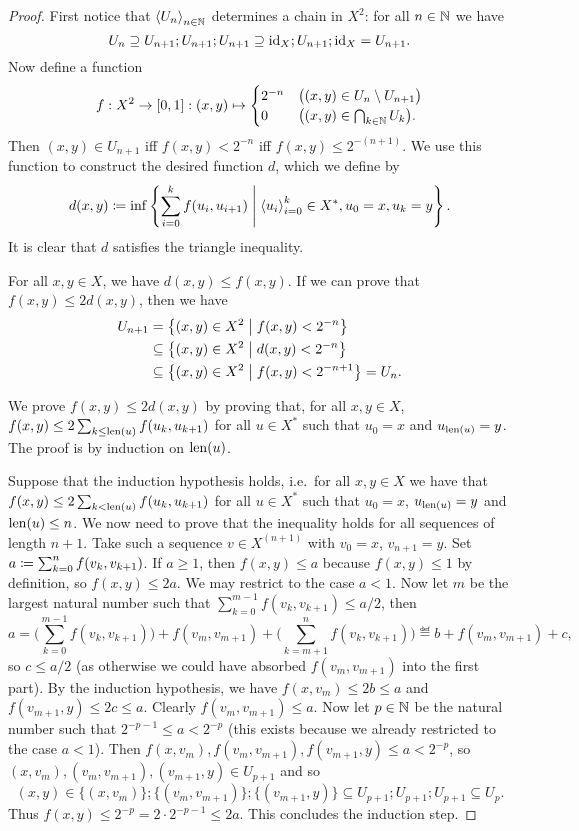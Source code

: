 \begin{proof}
First notice that $\left\langle U_n \right\rangle_{n\in \mathbb{N}}$ determines a chain in $X^2$: for all $n\in\mathbb{N}$ we have
\[ U_n \supseteq U_{n+1};U_{n+1};U_{n+1} \supseteq \operatorname{id}_X;U_{n+1};\operatorname{id}_X = U_{n+1}. \]
Now define a function
\[ f: X^2 \to \interval{0,1}: (x,y) \mapsto \begin{cases}
2^{-n} & \big((x,y)\in U_{n}\setminus U_{n+1}\big) \\
0 & \big((x,y)\in \bigcap_{k\in\N}U_k\big).
\end{cases} \]
Then $(x,y)\in U_{n+1}$ iff $f(x,y) < 2^{-n}$ iff $f(x,y) \leq 2^{-(n+1)}$.
We use this function to construct the desired function $d$, which we define by
\[ d(x,y) \coloneqq \inf\left\{ \sum_{i=0}^k f(u_i, u_{i+1}) \;\middle|\; \left\langle u_i \right\rangle_{i=0}^k\in X^*, u_0 = x, u_k = y \right\}. \]
It is clear that $d$ satisfies the triangle inequality.

For all $x,y\in X$, we have $d(x,y) \leq f(x,y)$. If we can prove that $f(x,y) \leq 2 d(x,y)$, then we have
\begin{align*}
U_{n+1} &= \left\{ (x,y)\in X^2 \;\middle|\; f(x,y)< 2^{-n} \right\} \\
&\subseteq \left\{ (x,y)\in X^2 \;\middle|\; d(x,y)< 2^{-n} \right\} \\
&\subseteq \left\{ (x,y)\in X^2 \;\middle|\; f(x,y)< 2^{-n+1} \right\} = U_{n}.
\end{align*}

We prove $f(x,y) \leq 2 d(x,y)$ by proving that, for all $x,y\in X$, $f(x,y) \leq 2 \sum_{k\leq\operatorname{len}(u)}f(u_k, u_{k+1})$ for all $u\in X^*$ such that $u_0 = x$ and $u_{\operatorname{len}(u)} = y$. The proof is by induction on $\operatorname{len}(u)$.

Suppose that the induction hypothesis holds, i.e.\ for all $x,y\in X$ we have that $f(x,y) \leq 2 \sum_{k<\operatorname{len}(u)}f(u_k, u_{k+1})$ for all $u\in X^*$ such that $u_0 = x$, $u_{\operatorname{len}(u)} = y$ and $\operatorname{len}(u)\leq n$. We now need to prove that the inequality holds for all sequences of length $n+1$. Take such a sequence $v \in X^{(n+1)}$ with $v_0 = x$, $v_{n+1} = y$. Set $a\coloneqq \sum_{k=0}^{n}f(v_k,v_{k+1})$. If $a\geq 1$, then $f(x,y)\leq a$ because $f(x,y)\leq 1$ by definition, so $f(x,y) \leq 2a$. We may restrict to the case $a<1$. Now let $m$ be the largest natural number such that $\sum_{k=0}^{m-1}f(v_k,v_{k+1}) \leq a/2$, then
\[ a = \Big(\sum_{k=0}^{m-1}f(v_k,v_{k+1})\Big) + f(v_m, v_{m+1}) + \Big(\sum_{k=m+1}^{n}f(v_k,v_{k+1})\Big) \eqdef b + f(v_m, v_{m+1}) + c, \]
so $c \leq a/2$ (as otherwise we could have absorbed $f(v_m, v_{m+1})$ into the first part). By the induction hypothesis, we have $f(x, v_m) \leq 2b \leq a$ and $f(v_{m+1}, y) \leq 2c \leq a$. Clearly $f(v_{m}, v_{m+1})\leq a$. Now let $p\in \mathbb{N}$ be the 
natural number such that $2^{-p-1}\leq a< 2^{-p}$ (this exists because we already restricted to the case $a< 1$).
Then $f(x,v_m), f(v_m, v_{m+1}), f(v_{m+1}, y) \leq a < 2^{-p}$, so $(x,v_m), (v_m, v_{m+1}), (v_{m+1}, y)\in U_{p+1}$ and so
\[ (x,y) \in \{(x,v_m)\}; \{(v_m, v_{m+1})\};\{(v_{m+1}, y)\} \subseteq U_{p+1};U_{p+1};U_{p+1} \subseteq U_p. \]
Thus $f(x,y) \leq 2^{-p} = 2\cdot 2^{-p-1} \leq 2a$. This concludes the induction step.


\end{proof}
